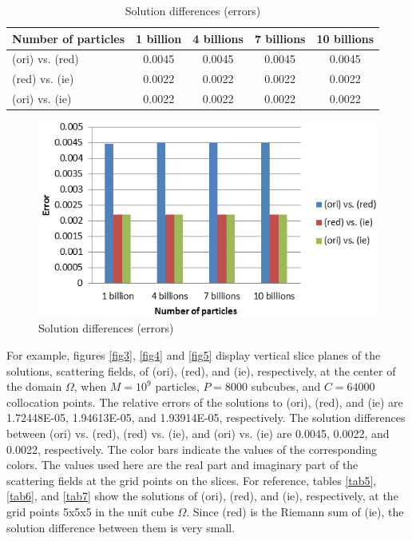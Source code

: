 \documentclass[12pt]{elsarticle}
\numberwithin{equation}{section}
\begin{document}
\begin{table}[H]
  \centering
  \caption{Solution differences (errors)}
    \begin{tabular}{lcccc}
    \toprule
    Number of particles & 1 billion & 4 billions & 7 billions & 10 billions \\
    \midrule
    (ori) vs. (red) & 0.0045 & 0.0045 & 0.0045 & 0.0045 \\
    (red) vs. (ie) & 0.0022 & 0.0022 & 0.0022 & 0.0022 \\
    (ori) vs. (ie) & 0.0022 & 0.0022 & 0.0022 & 0.0022 \\
    \bottomrule
    \end{tabular}%
  \label{tab4}%
\end{table}%
\begin{figure}[htbp]
\centering
\includegraphics[width=0.8\linewidth]{SolutionCompare}
\caption{Solution differences (errors)}
\label{fig2}
\end{figure}
For example, figures \ref{fig3}, \ref{fig4} and \ref{fig5} display vertical slice planes of the solutions, scattering fields, of (ori), (red), and (ie), respectively, at the center of the domain $\Omega$, when $M=10^9$ particles, $P=8000$ subcubes, and $C=64000$ collocation points. The relative errors of the solutions to (ori), (red), and (ie) are 1.72448E-05, 1.94613E-05, and 1.93914E-05, respectively. The solution differences between (ori) vs. (red), (red) vs. (ie), and (ori) vs. (ie) are 0.0045, 0.0022, and 0.0022, respectively. The color bars indicate the  values of the corresponding colors. The values used here are the real part and imaginary part of the scattering fields at the grid points on the slices. For reference, tables \ref{tab5}, \ref{tab6}, and \ref{tab7} show the solutions of (ori), (red), and (ie), respectively, at the grid points 5x5x5 in the unit cube $\Omega$. Since (red) is the Riemann sum of (ie), the solution difference between them is very small.
\end{document}
